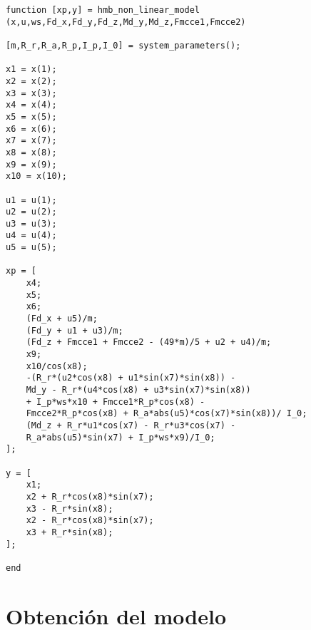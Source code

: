 \begin{lstlisting}[frame=single]
function [xp,y] = hmb_non_linear_model
(x,u,ws,Fd_x,Fd_y,Fd_z,Md_y,Md_z,Fmcce1,Fmcce2)

[m,R_r,R_a,R_p,I_p,I_0] = system_parameters();

x1 = x(1);
x2 = x(2);
x3 = x(3);
x4 = x(4);
x5 = x(5);
x6 = x(6);
x7 = x(7);
x8 = x(8);
x9 = x(9);
x10 = x(10);

u1 = u(1);
u2 = u(2);
u3 = u(3);
u4 = u(4);
u5 = u(5);

xp = [
	x4;
	x5;
	x6;
	(Fd_x + u5)/m;
	(Fd_y + u1 + u3)/m;
	(Fd_z + Fmcce1 + Fmcce2 - (49*m)/5 + u2 + u4)/m;
	x9;
	x10/cos(x8);
	-(R_r*(u2*cos(x8) + u1*sin(x7)*sin(x8)) - 
	Md_y - R_r*(u4*cos(x8) + u3*sin(x7)*sin(x8))   	
	+ I_p*ws*x10 + Fmcce1*R_p*cos(x8) - 
	Fmcce2*R_p*cos(x8) + R_a*abs(u5)*cos(x7)*sin(x8))/ I_0;
	(Md_z + R_r*u1*cos(x7) - R_r*u3*cos(x7) - 
	R_a*abs(u5)*sin(x7) + I_p*ws*x9)/I_0;
];

y = [
	x1;
	x2 + R_r*cos(x8)*sin(x7);
	x3 - R_r*sin(x8);
	x2 - R_r*cos(x8)*sin(x7);
	x3 + R_r*sin(x8);
];

end

\end{lstlisting}

\section{Obtenci\'on del modelo}

